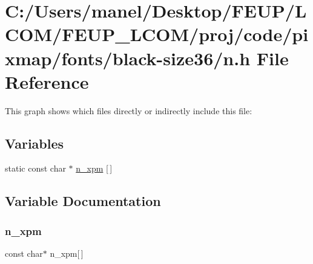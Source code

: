 \hypertarget{black-size36_2n_8h}{}\section{C\+:/\+Users/manel/\+Desktop/\+F\+E\+U\+P/\+L\+C\+O\+M/\+F\+E\+U\+P\+\_\+\+L\+C\+O\+M/proj/code/pixmap/fonts/black-\/size36/n.h File Reference}
\label{black-size36_2n_8h}
This graph shows which files directly or indirectly include this file\+:
\subsection*{Variables}
\begin{DoxyCompactItemize}
\item 
static const char $\ast$ \mbox{\hyperlink{black-size36_2n_8h_a5c6661a72ba47e7bc8b89ee6bdd504be}{n\+\_\+xpm}} \mbox{[}$\,$\mbox{]}
\end{DoxyCompactItemize}


\subsection{Variable Documentation}
\mbox{\label{black-size36_2n_8h_a5c6661a72ba47e7bc8b89ee6bdd504be}} 
\subsubsection{\texorpdfstring{n\_xpm}{n\_xpm}}
{\footnotesize\ttfamily const char$\ast$ n\+\_\+xpm\mbox{[}$\,$\mbox{]}\hspace{0.3cm}{\ttfamily [static]}}

